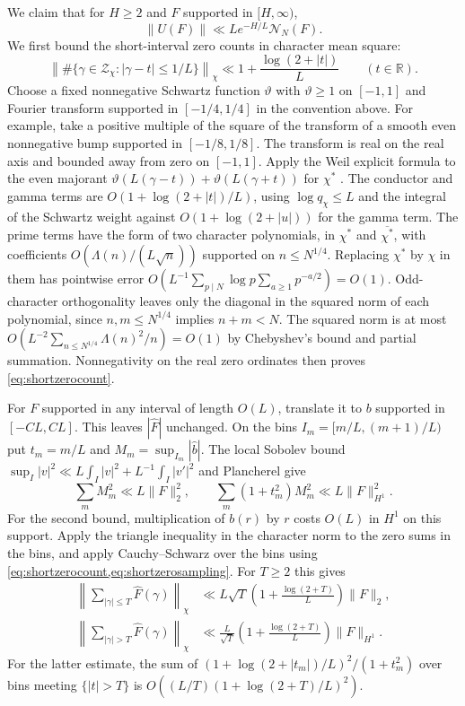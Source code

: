 \documentclass[11pt,a4paper]{article}
\numberwithin{equation}{section}
\newcommand{\NN}{\mathcal N_N}
\begin{document}
We claim that for $H\ge2$ and $F$ supported in $[H,\infty)$,
\begin{equation}
       \|U(F)\|\ll L e^{-H/L}\NN(F).
       \label{eq:Utail}
\end{equation}
We first bound the short-interval zero counts in character mean square:
\begin{equation}
 \left\|\#\{\gamma\in\mathcal Z_\chi:|\gamma-t|\le 1/L\}\right\|_\chi
    \ll 1+\frac{\log(2+|t|)}{L}
    \qquad(t\in\mathbb R).
 \label{eq:shortzerocount}
\end{equation}
Choose a fixed nonnegative Schwartz function $\vartheta$ with
$\vartheta\ge1$ on $[-1,1]$ and Fourier transform supported in
$[-1/4,1/4]$ in the convention above. For example, take a positive
multiple of the square of the transform of a smooth even nonnegative
bump supported in $[-1/8,1/8]$. The transform is real on the real
axis and bounded away from zero on $[-1,1]$.
Apply the Weil explicit formula to the even majorant
$\vartheta(L(\gamma-t))+\vartheta(L(\gamma+t))$
for $\chi^*$ \cite[Section~2]{HughesRudnick}.
The conductor and gamma terms are $O(1+\log(2+|t|)/L)$, using
$\log q_\chi\le L$ and the integral of the Schwartz weight
against $O(1+\log(2+|u|))$ for the gamma term.
The prime terms have the form of two character polynomials, in
$\chi^*$ and $\overline{\chi^*}$, with coefficients
$O(\Lambda(n)/(L\sqrt n))$ supported on $n\le N^{1/4}$.
Replacing $\chi^*$ by $\chi$ in them has pointwise error
$O(L^{-1}\sum_{p\mid N}\log p\sum_{a\ge1}p^{-a/2})=O(1)$.
Odd-character orthogonality leaves only the diagonal in the squared
norm of each polynomial, since $n,m\le N^{1/4}$ implies $n+m<N$.
The squared norm is at most
$O(L^{-2}\sum_{n\le N^{1/4}}\Lambda(n)^2/n)=O(1)$ by Chebyshev's
bound and partial summation. Nonnegativity on the real zero
ordinates then proves \cref{eq:shortzerocount}.

For $F$ supported in any interval of length $O(L)$, translate it
to $b$ supported in $[-CL,CL]$. This leaves $|\widehat F|$ unchanged.
On the bins $I_m=[m/L,(m+1)/L)$ put $t_m=m/L$ and
$M_m=\sup_{I_m}|\widehat b|$. The local Sobolev bound
$\sup_I|v|^2\ll L\int_I|v|^2+L^{-1}\int_I|v'|^2$ and
Plancherel give
\begin{equation}
 \sum_m M_m^2\ll L\|F\|_2^2,\qquad
 \sum_m(1+t_m^2) M_m^2\ll L\|F\|_{H^1}^2.
 \label{eq:shortzerosampling}
\end{equation}
For the second bound, multiplication of $b(r)$ by $r$ costs
$O(L)$ in $H^1$ on this support. Apply the triangle inequality in
the character norm to the zero sums in the bins, and apply
Cauchy--Schwarz over the bins using \cref{eq:shortzerocount,eq:shortzerosampling}.
For $T\ge2$ this gives
\begin{align}
 \left\|\sum_{|\gamma|\le T}\widehat F(\gamma)\right\|_\chi
     &\ll L\sqrt T\left(1+\frac{\log(2+T)}{L}\right)\|F\|_2,
       \label{eq:zeroslow}\\
 \left\|\sum_{|\gamma|>T}\widehat F(\gamma)\right\|_\chi
     &\ll \frac{L}{\sqrt T}\left(1+\frac{\log(2+T)}{L}\right)\|F\|_{H^1}.
       \label{eq:zeroshigh}
\end{align}
For the latter estimate, the sum of
$(1+\log(2+|t_m|)/L)^2/(1+t_m^2)$ over bins meeting
$\{|t|>T\}$ is $O((L/T)(1+\log(2+T)/L)^2)$.
\end{document}
